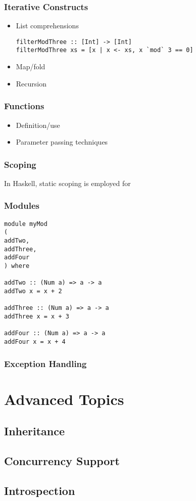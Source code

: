 \documentclass[titlepage,12pt]{article}
\newcommand{\bi}{\begin{itemize}}
\newcommand{\ei}{\end{itemize}}
\begin{document}
\subsubsection{Iterative Constructs}
\bi
    \item List comprehensions
\begin{verbatim}
filterModThree :: [Int] -> [Int]
filterModThree xs = [x | x <- xs, x `mod` 3 == 0]
\end{verbatim}
    \item Map/fold
    \item Recursion
\ei

\subsubsection{Functions}
\bi
    \item Definition/use
    \item Parameter passing techniques
\ei

\subsubsection{Scoping}
In Haskell, static scoping is employed for 

\subsubsection{Modules}
\begin{verbatim}
module myMod 
( 
addTwo,
addThree,
addFour
) where

addTwo :: (Num a) => a -> a
addTwo x = x + 2

addThree :: (Num a) => a -> a
addThree x = x + 3

addFour :: (Num a) => a -> a
addFour x = x + 4
\end{verbatim}
\subsubsection{Exception Handling}



\section{Advanced Topics}

\subsection{Inheritance}
\subsection{Concurrency Support}
\subsection{Introspection}




\end{document}
